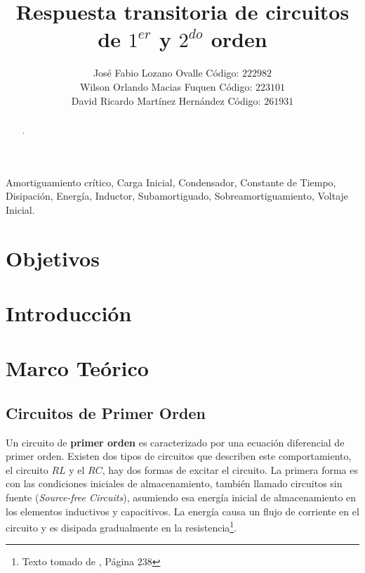 \documentclass[twocolumn]{IEEEtran}
\begin{document}
\title{Respuesta transitoria de circuitos de $1^{er}$ y $2^{do}$ orden}
\author{José Fabio Lozano Ovalle Código: $222982$\\
	Wilson Orlando Macias Fuquen Código: $223101$\\
	David Ricardo Martínez Hernández Código: $261931$}
\maketitle
{}

\begin{abstract}
.
\end{abstract}

\begin{keywords}
Amortiguamiento crítico, Carga Inicial, Condensador, Constante de Tiempo, Disipación, Energía, Inductor, Subamortiguado, Sobreamortiguamiento, Voltaje Inicial.
\end{keywords}

\section{Objetivos}

\section{Introducción}

\section{Marco Teórico}
\subsection{Circuitos de Primer Orden}
\noindent
Un circuito de \textbf{primer orden} es caracterizado por una ecuación diferencial de primer orden. Existen dos tipos de circuitos que describen este comportamiento, el circuito $RL$ y el $RC$, hay dos formas de excitar el circuito. La primera forma es con las condiciones iniciales de almacenamiento, también llamado circuitos sin fuente (\textit{Source-free Circuits}), asumiendo esa energía inicial de almacenamiento en los elementos inductivos y capacitivos. La energía causa un flujo de corriente en el circuito y es disipada gradualmente en la resistencia\footnote{Texto tomado de \cite{sadiku}, Página 238}.
\end{document}
